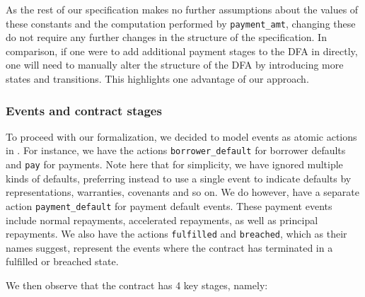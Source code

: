 \documentclass{article}
\begin{document}
As the rest of our specification makes no further assumptions about the values
of these constants and the computation performed by \texttt{payment\_amt},
changing these do not require any further changes in the structure of the 
specification.
In comparison, if one were to add additional payment stages to the DFA in
\cite{contract_as_automaton} directly, one will need to manually alter the
structure of the DFA by introducing more states and transitions.
This highlights one advantage of our approach.

\subsubsection{Events and contract stages}

To proceed with our formalization, we decided to model events as atomic
actions in \mcrl.
For instance, we have the actions \texttt{borrower\_default} for borrower
defaults and \texttt{pay} for payments.
Note here that for simplicity, we have ignored multiple kinds of defaults,
preferring instead to use a single event to indicate defaults by
representations, warranties, covenants and so on.
We do however, have a separate action \texttt{payment\_default} for payment
default events.
These payment events include normal repayments, accelerated repayments,
as well as principal repayments.
We also have the actions \texttt{fulfilled} and \texttt{breached}, which as
their names suggest, represent the events where the contract has terminated
in a fulfilled or breached state.

We then observe that the contract has 4 key stages, namely:
\end{document}
